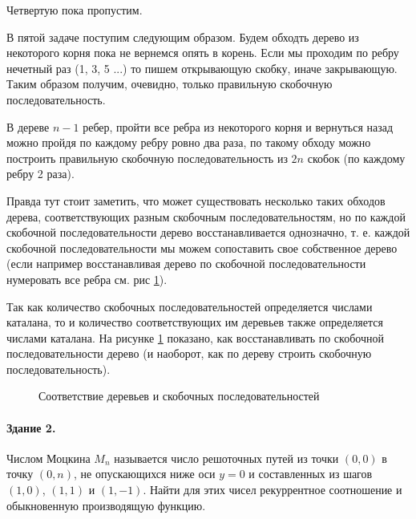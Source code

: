 \documentclass[a4paper,12pt]{article}
\begin{document}
\begin{Solution}
Четвертую пока пропустим.

В пятой задаче поступим следующим образом. Будем обходть дерево из некоторого корня пока не вернемся опять в корень. Если мы проходим по ребру нечетный раз (1, 3, 5 ...) то пишем открывающую скобку, иначе закрывающую. Таким образом получим, очевидно, только правильную скобочную последовательность.

В дереве $n-1$ ребер, пройти все ребра из некоторого корня и вернуться назад можно пройдя по каждому ребру ровно два раза, по такому обходу можно построить правильную скобочную последовательность из $2n$ скобок (по каждому ребру 2 раза).

Правда тут стоит заметить, что может существовать несколько таких обходов дерева, соответствующих разным скобочным последовательностям, но по каждой скобочной последовательности дерево восстанавливается однозначно, т. е. каждой скобочной последовательности мы можем сопоставить свое собственное дерево (если например восстанавливая дерево по скобочной последовательности нумеровать все ребра см. рис \ref{img::treetrav}).

Так как количество скобочных последовательностей определяется числами каталана, то и количество соответствующих им деревьев также определяется числами каталана. На рисунке \ref{img::treetrav} показано, как восстанавливать по скобочной последовательности дерево (и наоборот, как по дереву строить скобочную последовательность).

\begin{figure}[h]
\caption{Соответствие деревьев и скобочных последовательностей}
\label{img::treetrav}
\end{figure}

\end{Solution}


\paragraph{Здание 2.} Числом Моцкина $M_n$ называется число решоточных путей из точки $(0,0)$ в точку $(0,n)$, не опускающихся ниже оси $y=0$ и составленных из шагов $(1,0)$, $(1,1)$ и $(1,-1)$. Найти для этих чисел рекуррентное соотношение и обыкновенную производящую функцию.
\end{document}
